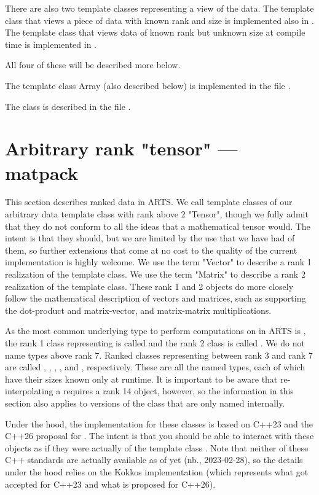 There are also two template classes representing a view of the data.  The template class that
views a piece of data with known rank and size is implemented also in .
The template class that views data of known rank but unknown size at compile time is implemented
in .

All four of these will be described more below.

The template class Array (also described below) is implemented in the file .

The  class is described in the file .

\section{Arbitrary rank "tensor" --- matpack}
This section describes ranked data in ARTS.  We call template classes of our arbitrary data
template class with rank above 2 "Tensor", though we fully admit that they do not conform to all the ideas
that a mathematical tensor would.  The intent is that they should, but we are limited by the
use that we have had of them, so further extensions that come at no cost to the quality of
the current implementation is highly welcome.  We use the term "Vector" to describe
a rank 1 realization of the template class.  We use the term "Matrix" to 
describe a rank 2 realization of the template class.  These rank 1 and 2 objects do more closely
follow the mathematical description of vectors and matrices, such as supporting the dot-product and
matrix-vector, and matrix-matrix multiplications.

As the most common underlying type
to perform computations on in ARTS is , the rank 1 class representing
 is called  and the rank 2 class is called .
We do not name types above rank 7.  Ranked classes representing  between rank 3
and rank 7 are called , , , ,
and , respectively.  These are all the named types, each of which have their
sizes known only at runtime.  It is important to be aware that re-interpolating a 
requires a rank 14 object, however, so the information in this section also applies to versions of 
the class that are only named internally.

Under the hood, the implementation for these classes is based on C++23 
and the C++26 proposal for .  The intent is that you should be able to
interact with these objects as if they were actually of the template class .
Note that neither of these C++ standards are actually available as of yet (nb., 2023-02-28), so the
details under the hood relies on the Kokkos implementation (which represents what got accepted for C++23
and what is proposed for C++26). 

